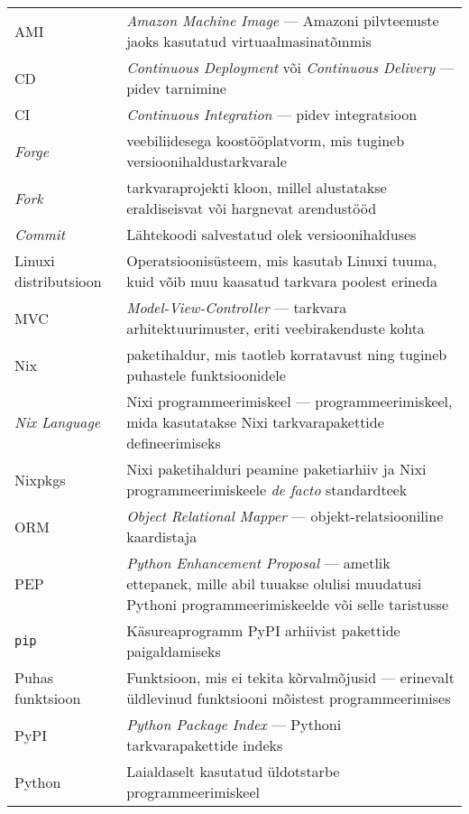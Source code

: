 \begin{longtable}{p{4cm}p{10cm}}
AMI&\textit{Amazon Machine Image} — Amazoni pilvteenuste jaoks kasutatud virtuaalmasinatõmmis\\
CD&\textit{Continuous Deployment} või \textit{Continuous Delivery} — pidev tarnimine\\
CI&\textit{Continuous Integration} — pidev integratsioon\\
\textit{Forge}&veebiliidesega koostööplatvorm, mis tugineb versioonihaldustarkvarale\\
\textit{Fork}&tarkvaraprojekti kloon, millel alustatakse eraldiseisvat või hargnevat arendustööd\\
\textit{Commit}&Lähtekoodi salvestatud olek versioonihalduses\\
Linuxi distributsioon&Operatsioonisüsteem, mis kasutab Linuxi tuuma, kuid võib muu kaasatud tarkvara poolest erineda\\
MVC&\textit{Model-View-Controller} — tarkvara arhitektuurimuster, eriti veebirakenduste kohta\\
Nix&paketihaldur, mis taotleb korratavust ning tugineb puhastele funktsioonidele\\
\textit{Nix Language}& Nixi programmeerimiskeel — programmeerimiskeel, mida kasutatakse Nixi tarkvarapakettide defineerimiseks\\
Nixpkgs&Nixi paketihalduri peamine paketiarhiiv ja Nixi programmeerimiskeele \textit{de facto} standardteek\\
ORM&\emph{Object Relational Mapper} — objekt-relatsiooniline kaardistaja\\
PEP&\textit{Python Enhancement Proposal} — ametlik ettepanek, mille abil tuuakse olulisi muudatusi Pythoni programmeerimiskeelde või selle taristusse\\
\texttt{pip}&Käsureaprogramm PyPI arhiivist pakettide paigaldamiseks\\
Puhas funktsioon&Funktsioon, mis ei tekita kõrvalmõjusid — erinevalt üldlevinud funktsiooni mõistest programmeerimises\\
PyPI&\textit{Python Package Index} — Pythoni tarkvarapakettide indeks\\
Python&Laialdaselt kasutatud üldotstarbe programmeerimiskeel\\
\end{longtable}
\addtocounter{table}{-1} 

